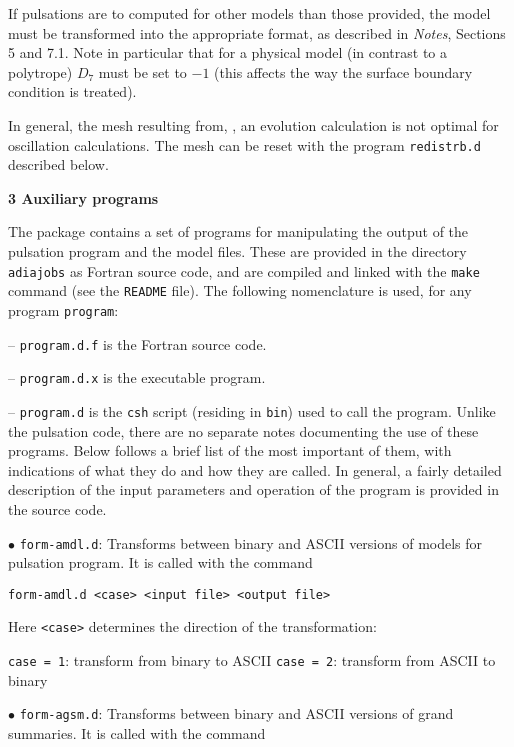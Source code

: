 If pulsations are to computed for other models than those provided,
the model must be transformed into the appropriate format,
as described in {\it Notes}, Sections 5 and 7.1.
Note in particular that for a physical model (in contrast to
a polytrope) $D_7$ must be set to $-1$ (this affects the
way the surface boundary condition is treated).

In general, the mesh resulting from, {\eg}, an evolution
calculation is not optimal for oscillation calculations.
The mesh can be reset with the program {\tt redistrb.d}
described below.

\mainsect
{\bf 3 Auxiliary programs}

The package contains a set of programs for manipulating the output
of the pulsation program and the model files. 
These are provided in the directory {\tt adiajobs} as Fortran source code,
and are compiled and linked with the {\tt make} command
(see the {\tt README} file).
The following nomenclature is used, for any program {\tt program}:
\medskip
\item{--} {\tt program.d.f} is the Fortran source code. 
\item{--} {\tt program.d.x} is the executable program.
\item{--} {\tt program.d} is the {\tt csh} script
(residing in {\tt bin}) used to call the program.
\medskip
Unlike the pulsation code, there are no separate notes documenting the
use of these programs.
Below follows a brief list of the most important of them,
with indications of what they do and how they are called.
In general, a fairly detailed description of the input parameters
and operation of the program is provided in the source code.

\medskip
\item{$\bullet$}
{\tt form-amdl.d}:
Transforms between binary and ASCII versions of models for pulsation program.
It is called with the command

{\tt form-amdl.d <case> <input file> <output file>}

\item{}
Here {\tt <case>} determines the direction of the transformation:

\itemitem{--} {\tt case = 1}: transform from binary to ASCII
\itemitem{--} {\tt case = 2}: transform from ASCII to binary


\medskip
\item{$\bullet$}
{\tt form-agsm.d}:
Transforms between binary and ASCII versions of grand summaries.
It is called with the command

